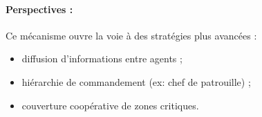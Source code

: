 \paragraph{Perspectives :}
Ce mécanisme ouvre la voie à des stratégies plus avancées :
\begin{itemize}
    \item diffusion d’informations entre agents ;
    \item hiérarchie de commandement (ex: chef de patrouille) ;
    \item couverture coopérative de zones critiques.
\end{itemize}
